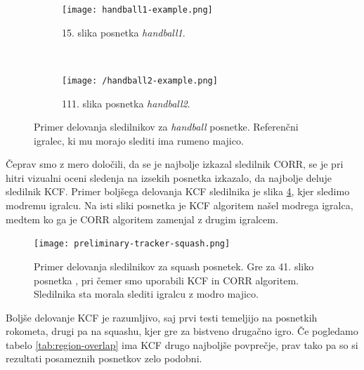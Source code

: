 \begin{figure}[!htbp]
	\centering
	
	\begin{subfigure}[t]{0.45\columnwidth}
		\texttt{[image: handball1-example.png]}
		\caption{15. slika posnetka \textit{handball1}.}
		\label{fig:handball1}
	\end{subfigure}
	~
	\begin{subfigure}[t]{0.45\columnwidth}
		\texttt{[image: /handball2-example.png]}
		\caption{111. slika posnetka \textit{handball2}.}
		\label{fig:handball2}
	\end{subfigure}  
	\caption[Primer delovanja sledilnikov za \textit{handball} posnetke]{Primer delovanja sledilnikov za \textit{handball} posnetke. Referenčni igralec, ki mu morajo slediti ima rumeno majico. }
	\label{fig:tracker-visual}
\end{figure}




Čeprav smo z mero določili, da se je najbolje izkazal sledilnik CORR, se je pri hitri vizualni oceni sledenja na izsekih posnetka \cite{squashtv2014squash} izkazalo, da najbolje deluje sledilnik KCF. Primer boljšega delovanja KCF sledilnika je slika \ref{fig:squash-tracker-visual}, kjer sledimo modremu igralcu. Na isti sliki posnetka je KCF algoritem našel modrega igralca, medtem ko ga je CORR algoritem zamenjal z drugim igralcem. 



\begin{figure}[!htbp]
	\centering
	\texttt{[image: preliminary-tracker-squash.png]}
	\caption{}
	\caption[Primer delovanja sledilnikov za squash posnetek]{Primer delovanja sledilnikov za squash posnetek. Gre za 41. sliko posnetka \cite{squashtv2014squash}, pri čemer smo uporabili KCF in CORR algoritem. Sledilnika sta morala slediti igralcu z modro majico.}
	\label{fig:squash-tracker-visual}
\end{figure}


Boljše delovanje KCF je razumljivo, saj prvi testi temeljijo na posnetkih rokometa, drugi pa na squashu, kjer gre za bistveno drugačno igro. Če pogledamo tabelo \ref{tab:region-overlap} ima KCF drugo najboljše povprečje, prav tako pa so si rezultati posameznih posnetkov zelo podobni. 


















